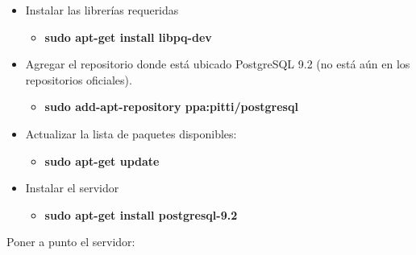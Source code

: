 \begin{itemize}
\item Instalar las librerías requeridas
\begin{itemize}
\item \textbf{sudo apt-get install libpq-dev}
\end{itemize}
\item Agregar el repositorio donde está ubicado PostgreSQL 9.2 (no está aún en los repositorios oficiales).
\begin{itemize}
\item \textbf{sudo add-apt-repository ppa:pitti/postgresql}
\end{itemize}

\item Actualizar la lista de paquetes disponibles:
\begin{itemize}
\item \textbf{sudo apt-get update}
\end{itemize}

\item Instalar el servidor

\begin{itemize}
\item \textbf{sudo apt-get install postgresql-9.2}
\end{itemize}

\end{itemize}

Poner a punto el servidor:

